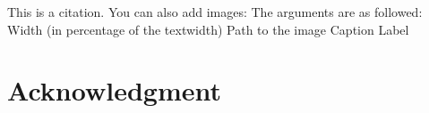 \markdownRendererInterblockSeparator
{}\lipsum[3]\markdownRendererInterblockSeparator
{}\markdownRendererInterblockSeparator
{}\lipsum[3]\markdownRendererInterblockSeparator
{}\markdownRendererInterblockSeparator
{}\lipsum[3]\markdownRendererInterblockSeparator
{}\markdownRendererInterblockSeparator
{}\lipsum[3]\markdownRendererInterblockSeparator
{}\markdownRendererInterblockSeparator
{}This is a citation.\cite{Goodfellow.2016}\markdownRendererInterblockSeparator
{}You can also add images:\markdownRendererInterblockSeparator
{}\markdownRendererInterblockSeparator
{}The arguments are as followed:\markdownRendererInterblockSeparator
{}\markdownRendererOlBeginTight
{}Width (in percentage of the textwidth)\markdownRendererOlItemEnd 
{}Path to the image\markdownRendererOlItemEnd 
{}Caption\markdownRendererOlItemEnd 
{}Label\markdownRendererOlItemEnd 
\markdownRendererOlEndTight \markdownRendererInterblockSeparator
{}\section*{Acknowledgment}\markdownRendererInterblockSeparator
{}\lipsum[1]\relax